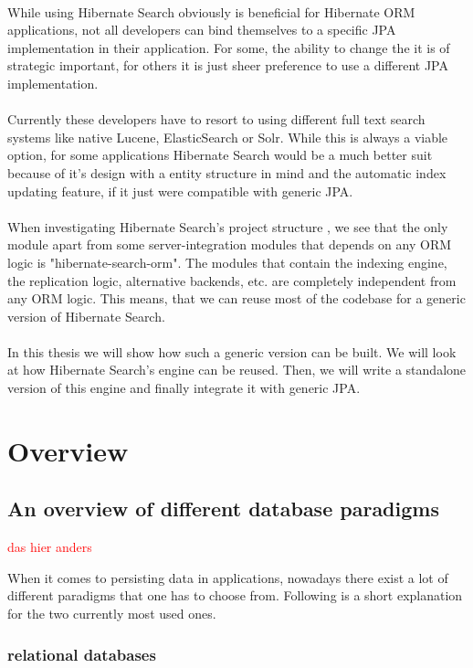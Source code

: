 \\
While using Hibernate Search obviously is beneficial for Hibernate ORM applications, not all developers can bind themselves to a specific JPA implementation in their application. For some, the ability to change the it is of strategic important, for others it is just sheer preference to use a different JPA implementation.
\\\\
Currently these developers have to resort to using different full text search systems like native Lucene, ElasticSearch or Solr. While this is always a viable option, for some applications Hibernate Search would be a much better suit because of it's design with a entity structure in mind and the automatic index updating feature, if it just were compatible with generic JPA.
\\\\
When investigating Hibernate Search's project structure \cite{source-code-git}, we see that the only module apart from some server-integration modules that depends on any ORM logic is "hibernate-search-orm". The modules that contain the indexing engine, the replication logic, alternative backends, etc. are completely independent from any ORM logic. This means, that we can reuse most of the codebase for a generic version of Hibernate Search.
\\\\
In this thesis we will show how such a generic version can be built. We will look at how Hibernate Search's engine can be reused. Then, we will write a standalone version of this engine and finally integrate it with generic JPA.

\pagebreak

\section{Overview}\label{Introduction}

\subsection{An overview of different database paradigms}

\textcolor{red}{das hier anders}

When it comes to persisting data in applications, nowadays there exist a lot of different
paradigms that one has to choose from. Following is a short explanation for the two currently most used ones.

\subsubsection{relational databases}

